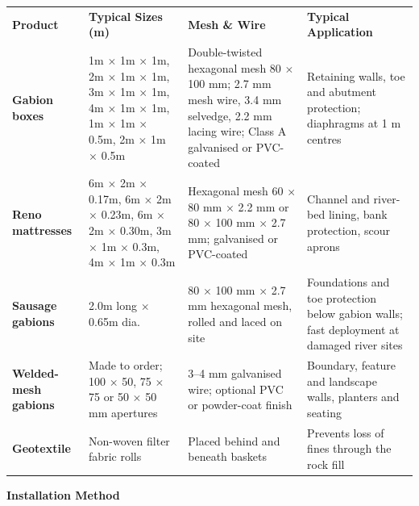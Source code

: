 \documentclass[a4paper,11pt]{article}
\begin{document}
{\fontsize{7.6pt}{9.4pt}\selectfont\noindent
\renewcommand{\arraystretch}{1.18}
\begin{tabularx}{\textwidth}{@{}p{2.4cm} p{4.4cm} p{5.2cm} X@{}}
\rowcolor{mhnavy}
{\color{white}\bfseries Product} &
{\color{white}\bfseries Typical Sizes (m)} &
{\color{white}\bfseries Mesh \& Wire} &
{\color{white}\bfseries Typical Application} \\
\rowcolor{mhbluelight}
\bfseries Gabion boxes & 1m $\times$ 1m $\times$ 1m, 2m $\times$ 1m $\times$ 1m, 3m $\times$ 1m $\times$ 1m, 4m $\times$ 1m $\times$ 1m, 1m $\times$ 1m $\times$ 0.5m, 2m $\times$ 1m $\times$ 0.5m & Double-twisted hexagonal mesh 80 $\times$ 100 mm; 2.7 mm mesh wire, 3.4 mm selvedge, 2.2 mm lacing wire; Class A galvanised or PVC-coated & Retaining walls, toe and abutment protection; diaphragms at 1 m centres \\
\bfseries Reno mattresses & 6m $\times$ 2m $\times$ 0.17m, 6m $\times$ 2m $\times$ 0.23m, 6m $\times$ 2m $\times$ 0.30m, 3m $\times$ 1m $\times$ 0.3m, 4m $\times$ 1m $\times$ 0.3m & Hexagonal mesh 60 $\times$ 80 mm $\times$ 2.2 mm or 80 $\times$ 100 mm $\times$ 2.7 mm; galvanised or PVC-coated & Channel and river-bed lining, bank protection, scour aprons \\
\rowcolor{mhbluelight}
\bfseries Sausage gabions & 2.0m long $\times$ 0.65m dia. & 80 $\times$ 100 mm $\times$ 2.7 mm hexagonal mesh, rolled and laced on site & Foundations and toe protection below gabion walls; fast deployment at damaged river sites \\
\bfseries Welded-mesh gabions & Made to order; 100 $\times$ 50, 75 $\times$ 75 or 50 $\times$ 50 mm apertures & 3--4 mm galvanised wire; optional PVC or powder-coat finish & Boundary, feature and landscape walls, planters and seating \\
\rowcolor{mhbluelight}
\bfseries Geotextile & Non-woven filter fabric rolls & Placed behind and beneath baskets & Prevents loss of fines through the rock fill \\
\end{tabularx}
\renewcommand{\arraystretch}{1}
}

\vspace{0.10cm}

\vfill

\noindent
{\large\bfseries\color{mhnavy} Installation Method}
\vspace{0.12cm}
\end{document}
